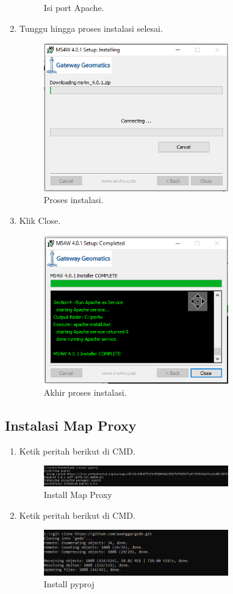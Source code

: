 \begin{enumerate}
\begin{figure}[H]
		\centering
		\caption{Isi port Apache.}
	\end{figure}
	\item  Tunggu hingga proses instalasi selesai.
	\hfill\break
	\begin{figure}[H]
		\includegraphics[width=8cm]{figures/Tugas4/1174087/7.png}
		\centering
		\caption{Proses instalasi.}
	\end{figure}
	\item  Klik Close.
	\hfill\break
	\begin{figure}[H]
		\includegraphics[width=8cm]{figures/Tugas4/1174087/8.png}
		\centering
		\caption{Akhir proses instalasi.}
	\end{figure}
\end{enumerate}
\subsection{Instalasi Map Proxy}
\begin{enumerate}
	\item  Ketik peritah berikut di CMD.
	\hfill\break
	\begin{figure}[H]
		\includegraphics[width=8cm]{figures/Tugas4/1174087/11.png}
		\centering
		\caption{Install Map Proxy}
	\end{figure}
	\item  Ketik peritah berikut di CMD.
	\hfill\break
	\begin{figure}[H]
		\includegraphics[width=8cm]{figures/Tugas4/1174087/12.png}
		\centering
		\caption{Install pyproj}
	\end{figure}
\end{enumerate}
